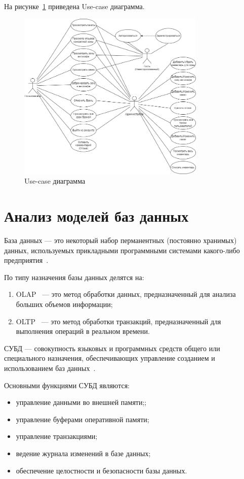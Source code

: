 \clearpage

На рисунке~\ref{fig:use-case} приведена Use-case диаграмма. 

\begin{figure}[h]
	\centering
	\includegraphics[width=0.8\textwidth]{img/use-case.png}
	\caption{Use-case диаграмма}
	\label{fig:use-case}
\end{figure}

\section{Анализ моделей баз данных}
База данных --- это некоторый набор перманентных (постоянно хранимых) данных, используемых прикладными программными системами какого-либо предприятия~\cite{intro-db-williams}.

По типу назначения базы данных делятся на:
\begin{enumerate}
	\item OLAP~\cite{intro-db-williams} --- это метод обработки данных, предназначенный для анализа больших объемов информации;
	\item OLTP~\cite{intro-db-williams} --- это метод обработки транзакций, предназначенный для выполнения операций в реальном времени.
\end{enumerate}

\clearpage

СУБД --- совокупность языковых и программных средств общего или специального назначения, обеспечивающих управление созданием и использованием баз данных~\cite{intro-db-williams}.

Основными функциями СУБД являются:
\begin{itemize}
	\item управление данными во внешней памяти;;
	\item управление буферами оперативной памяти;
	\item управление транзакциями;
	\item ведение журнала изменений в базе данных;
	\item обеспечение целостности и безопасности базы данных.
\end{itemize}

